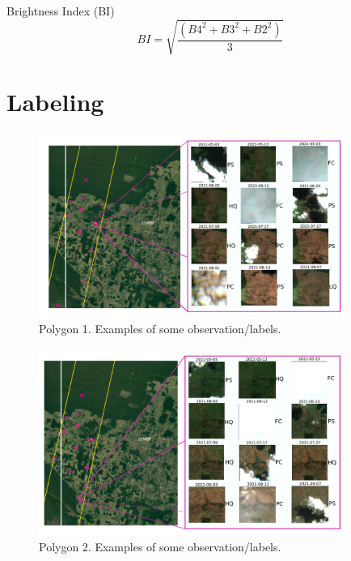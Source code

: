 \documentclass{beamer}
\begin{document}
\begin{frame}{Brightness Index (BI)}
    \begin{equation}
        BI = \sqrt{\frac{ (B4^2 + B3^2 + B2^2)}{3}}
    \end{equation}
    
\end{frame}

\section{Labeling}
\begin{frame}
    \begin{figure}
        \includegraphics[width=10cm]{Figures/v3/labeling/polygon_0.pdf}
        \caption{Polygon 1. Examples of some observation/labels.}  
        \centering
    \end{figure}
\end{frame}

\begin{frame}
    \begin{figure}
        \includegraphics[width=10cm]{Figures/v3/labeling/polygon_2.pdf}
        \caption{Polygon 2. Examples of some observation/labels.}  
        \centering
    \end{figure}
\end{frame}
\end{document}

